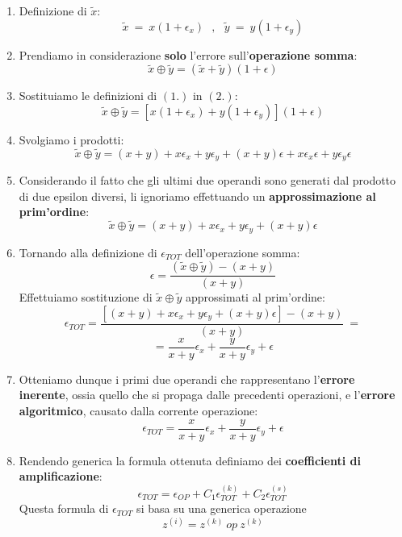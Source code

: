 \documentclass{article}
\begin{document}
\begin{enumerate}
    \item Definizione di $\tilde{x}$:
    \[ {\tilde{x} \: = \: x(1+\epsilon_{x})} \:\:\:,\:\:\: {\tilde{y} \: = \: y(1+\epsilon_{y})}\]
    \item Prendiamo in considerazione \textbf{solo} l'errore sull'\textbf{operazione somma}:
    \[ \tilde{x} \oplus \tilde{y} = (\tilde{x} + \tilde{y})(1+\epsilon)\]
    \item Sostituiamo le definizioni di $(1.)$ in $(2.)$:
    \[ \tilde{x} \oplus \tilde{y} = [x(1+\epsilon_{x}) + y(1+\epsilon_{y})](1+\epsilon) \]
    \newpage
    \item Svolgiamo i prodotti:
    \[ \tilde{x} \oplus \tilde{y} = (x+y) + x\epsilon_{x} + y\epsilon_{y} + (x+y)\epsilon + x\epsilon_{x}\epsilon + y\epsilon_{y}\epsilon \]
    \item Considerando il fatto che gli ultimi due operandi sono generati dal prodotto di due epsilon diversi, li ignoriamo effettuando un \textbf{approssimazione al prim'ordine}:
    \[ \tilde{x} \oplus \tilde{y} = (x+y) + x\epsilon_{x} + y\epsilon_{y} + (x+y)\epsilon \]
    \item Tornando alla definizione di $\epsilon_{TOT}$ dell'operazione somma:
    \[ \epsilon = \frac{(\tilde{x} \oplus \tilde{y}) - (x + y)}{(x + y)} \]
    \vspace*{10px}
    Effettuiamo sostituzione di $\tilde{x} \oplus \tilde{y}$ approssimati al prim'ordine:
    \[ \epsilon_{TOT} = \frac{[(x+y) + x\epsilon_{x} + y\epsilon_{y} + (x+y)\epsilon] - (x + y)}{(x + y)} \: = \]
    \[ = \frac{x}{x+y}\epsilon_{x} + \frac{y}{x+y}\epsilon_{y} + \epsilon \]
    \item Otteniamo dunque i primi due operandi che rappresentano l'\textbf{errore inerente}, ossia quello che si propaga dalle precedenti operazioni, e l'\textbf{errore algoritmico}, causato dalla corrente operazione:
    \[ \boxed{\epsilon_{TOT} = \frac{x}{x+y}\epsilon_{x} + \frac{y}{x+y}\epsilon_{y} + \epsilon} \]
    \item Rendendo generica la formula ottenuta definiamo dei \textbf{coefficienti di amplificazione}:
    \[ \boxed{ \epsilon_{TOT} = \epsilon_{OP} + C_{1}\epsilon_{TOT}^{(k)} + C_{2}\epsilon_{TOT}^{(s)} } \]
    Questa formula di $\epsilon_{TOT}$ si basa su una generica operazione
    \[ \boxed{z^{(i)} = z^{(k)} \: op \:z^{(k)}} \]
    
\end{enumerate}

\newpage
\end{document}
